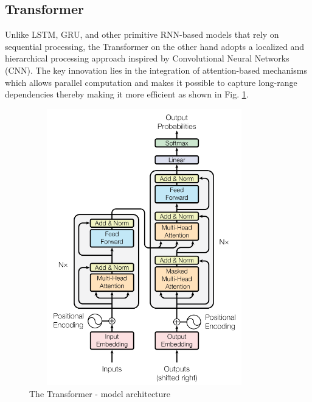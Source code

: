 \documentclass{ws-ijait}
\begin{document}
\subsection{Transformer}
Unlike LSTM, GRU, and other primitive RNN-based models that rely on sequential processing, the Transformer on the other hand adopts a localized and hierarchical processing approach inspired by Convolutional Neural Networks (CNN). The key innovation lies in the integration of attention-based mechanisms which allows parallel computation and makes it possible to capture long-range dependencies thereby making it more efficient as shown in Fig. \ref{transformer}.
\begin{center}
	\begin{figure}[!htbp]
		\centering
		\includegraphics[width=10cm, height=12cm]{transformer.png}
		\caption{The Transformer - model architecture}
		\label{transformer}
	\end{figure}
\end{center}
\end{document}
